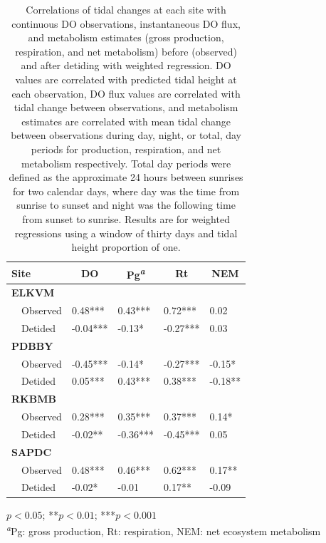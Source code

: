 \documentclass[letterpaper,12pt,oneside]{article}\usepackage[]{graphicx}\usepackage[]{color}
\begin{document}
%
\begin{table}[!tbp]
\caption{Correlations of tidal changes at each site with continuous \ac{DO} observations, instantaneous \ac{DO} flux, and metabolism estimates (gross production, respiration, and net metabolism) before (observed) and after detiding with weighted regression.  \ac{DO} values are correlated with predicted tidal height at each observation, \ac{DO} flux values are correlated with tidal change between observations, and metabolism estimates are correlated with mean tidal change between observations during day, night, or total, day periods for production, respiration, and net metabolism respectively.  Total day periods were defined as the approximate 24 hours between sunrises for two calendar days, where day was the time from sunrise to sunset and night was the following time from sunset to sunrise.  Results are for weighted regressions using a window of thirty days and tidal height proportion of one.\label{tab:cor_res}} 
\begin{center}
\begin{tabular}{lllll}
\hline\hline
\multicolumn{1}{l}{Site}&\multicolumn{1}{c}{DO}&\multicolumn{1}{c}{Pg\textsuperscript{\textit{a}}}&\multicolumn{1}{c}{Rt}&\multicolumn{1}{c}{NEM}\tabularnewline
\hline
{\bfseries ELKVM}&&&&\tabularnewline
~~Observed& 0.48***& 0.43***& 0.72***& 0.02 \tabularnewline
~~Detided&-0.04***&-0.13*&-0.27***& 0.03 \tabularnewline
\hline
{\bfseries PDBBY}&&&&\tabularnewline
~~Observed&-0.45***&-0.14*&-0.27***&-0.15*\tabularnewline
~~Detided& 0.05***& 0.43***& 0.38***&-0.18**\tabularnewline
\hline
{\bfseries RKBMB}&&&&\tabularnewline
~~Observed& 0.28***& 0.35***& 0.37***& 0.14*\tabularnewline
~~Detided&-0.02**&-0.36***&-0.45***& 0.05 \tabularnewline
\hline
{\bfseries SAPDC}&&&&\tabularnewline
~~Observed& 0.48***& 0.46***& 0.62***& 0.17**\tabularnewline
~~Detided&-0.02*&-0.01 & 0.17**&-0.09 \tabularnewline
\hline
\end{tabular}
\end{center}
\footnotesize *$p<0.05$; **$p<0.01$; ***$p<0.001$\\\textsuperscript{\textit{a}}Pg: gross production, Rt: respiration, NEM: net ecosystem metabolism\end{table}
\end{document}
